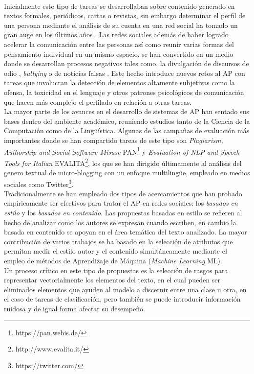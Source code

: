 \\
Inicialmente este tipo de tareas se desarrollaban sobre contenido generado en textos formales, periódicos, cartas o revistas, sin embargo determinar el perfil de una persona mediante el análisis de su cuenta en una red social ha tomado un gran auge en los últimos años \citep{rangel:2018,rangel:2019,f6032ffbacb14369b7a45d1ba9bd0b8c}.
 Las redes sociales además de haber logrado acelerar la comunicación entre las personas así como reunir varias formas del pensamiento individual en un mismo espacio, se han convertido en un medio donde se desarrollan procesos negativos tales como, la divulgación de discursos de odio \citep{rangel2021profiling}, \textit{bullying} o de noticias falsas \citep{rangel:2020}. Este hecho introduce nuevos retos al AP con tareas que involucran la detección de elementos altamente subjetivas como la ofensa, la toxicidad en el lenguaje y otros patrones psicológicos de comunicación que hacen más complejo el perfilado en relación a otras tareas.  
\\
 La mayor parte de los avances en el desarrollo de sistemas de AP han sentado sus bases dentro del ambiente académico, reuniendo estudios tanto de la Ciencia de la Computación como de la Lingüística. Algunas de las campañas de evaluación más importantes donde se han compartido tareas de este tipo son \textit{Plagiarism, Authorship and Social Software Misuse} PAN\footnote{https://pan.webis.de/} y \textit{Evaluation of NLP and Speech Tools for Italian} EVALITA\footnote{http://www.evalita.it/}, los que se han dirigido últimamente al análisis del genero textual de micro-blogging  con un enfoque multilingüe, empleado en medios sociales como Twitter\footnote{https://twitter.com/}.
\\
Tradicionalmente se han empleado dos tipos de acercamientos que han probado empíricamente ser efectivos para tratar el AP en redes sociales: los \textit{basados en estilo}  y los \textit{basados en contenido}. Las propuestas basadas en estilo se refieren al hecho de analizar como los autores se expresan cuando escriben, en cambio la basada en contenido se apoyan en el área temática del texto analizado. La mayor contribución de varios trabajos se ha basado en la selección de atributos que permitan medir el estilo autor y el contenido simultáneamente mediante el empleo de métodos de Aprendizaje de Máquina (\textit{Machine Learning} ML).
\\
Un proceso crítico en este tipo de propuestas es la selección de rasgos para representar vectorialmente los elementos del texto,  en el cual pueden ser eliminados elementos que ayuden al modelo a discernir entre una clase u otra, en el caso de tareas de clasificación, pero también se puede introducir información ruidosa y de igual forma afectar su desempeño. 
